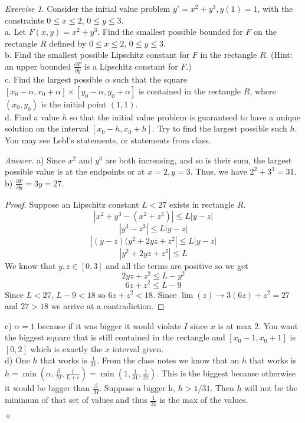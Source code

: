 \documentclass[12pt,oneside]{amsart}
\theoremstyle{definition}
\theoremstyle{remark}
\newtheorem{exer}{Exercise}
\numberwithin{equation}{exer}
\newenvironment{answer}{\bigskip\noindent\emph{Answer.}}{\hfill$\diamond$\newline}
\begin{document}
\newpage
\begin{exer}
Consider the initial value problem $y'=x^2+y^3, y(1)=1$, with the constraints $0\leq x\leq 2$, $0\leq y \leq 3$. \\
a. Let $F(x,y)=x^2+y^3$. Find the smallest possible bounded for $F$ on the rectangle $R$ defined by $0\leq x\leq 2$, $0\leq y\leq 3$. \\
b. Find the smallest possible Lipschitz constant for $F$ in the rectangle $R$. (Hint: an upper bounded $\frac{\partial F}{\partial y}$ is a Lipschitz constant for $F$.) \\
c. Find the largest possible $\alpha$ such that the square $[x_0-\alpha,x_0+\alpha]\times[y_0-\alpha,y_0+\alpha]$ is contained in the rectangle $R$, where $(x_0,y_0)$ is the initial point $(1,1)$. \\
d. Find a value $h$ so that the initial value problem is guaranteed to have a unique solution on the interval $[x_0-h,x_0+h]$. Try to find the largest possible such $h$. You may see Lebl's statements, or statements from class.
\end{exer}
\begin{answer}
a) Since $x^2$ and $y^3$ are both increasing, and so is their sum, the largest possible value is at the endpoints or at $x=2,y=3$. Thus, we have $2^2+3^3=\boxed{31}$. \\
b) $\frac{\partial F}{\partial y}=3y=\boxed{27}$. 
\begin{proof}
Suppose an Lipschitz constant $L<27$ exists in rectangle $R$.
$$|x^2+y^3-(x^2+z^3)|\leq L|y-z|$$ 
$$|y^3-z^3|\leq L|y-z|$$
$$|(y-z)(y^2+2yz+z^2|\leq L|y-z|$$
$$|y^2+2yz+z^2|\leq L$$
We know that $y,z\in[0,3]$ and all the terms are positive so we get
$$2yz+z^2\leq L-y^2$$
$$6z+z^2\leq L-9$$
Since $L<27$, $L-9<18$ so $6z+z^2<18$. Since $\lim(z)\rightarrow 3(6z)+z^2=27$ and $27>18$ we arrive at a contradiction.
\end{proof}
c) $\boxed{\alpha=1}$ because if it was bigger it would violate $I$ since $x$ is at max $2$. You want the biggest square that is still contained in the rectangle and $[x_0-1, x_0+1]$ is $[0,2]$ which is exactly the $x$ interval given. \\
d) One $h$ that works is $\boxed{\frac{1}{31}}$. From the class notes we know that an $h$ that works is $h=\min(\alpha,\frac{\beta}{M},\frac{1}{L+\epsilon})=\min(1,\frac{1}{31},\frac{1}{27})$. This is the biggest because otherwise it would be bigger than $\frac{\beta}{M}$.
Suppose a bigger h, $h>1/31$. Then $h$ will not be the minimum of that set of values and thus $\frac{1}{31}$ is the max of the values.


\end{answer}
\end{document}
